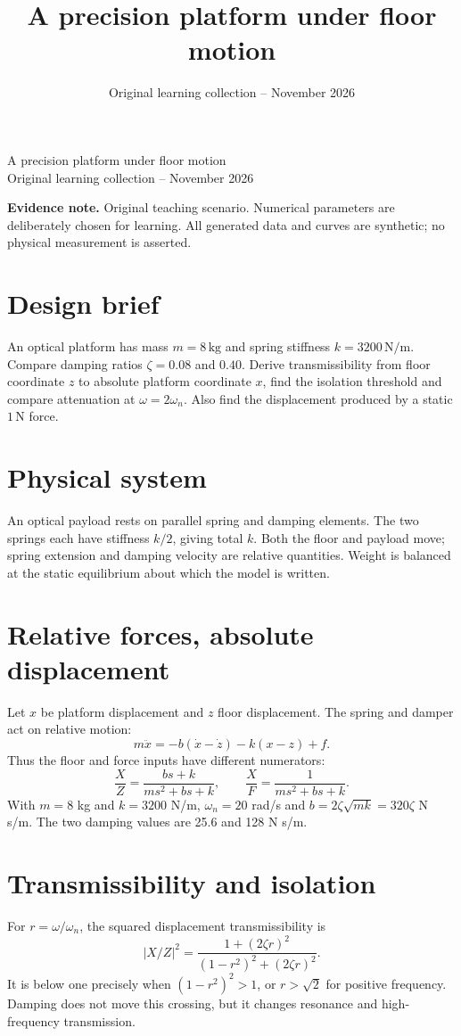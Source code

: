 \documentclass[10pt,a4paper]{article}
\title{\color{ink}A precision platform under floor motion}
\author{}
\date{Original learning collection -- November 2026}
\begin{document}
\begin{center}{\LARGE\color{ink}A precision platform under floor motion}\\[5pt]{\small Original learning collection -- November 2026}\end{center}

\textbf{Evidence note.} Original teaching scenario. Numerical parameters are deliberately chosen for learning. All generated data and curves are synthetic; no physical measurement is asserted.
\section{Design brief}
An optical platform has mass $m=8\,\mathrm{kg}$ and spring stiffness $k=3200\,\mathrm{N/m}$. Compare damping ratios $\zeta=0.08$ and $0.40$. Derive transmissibility from floor coordinate $z$ to absolute platform coordinate $x$, find the isolation threshold and compare attenuation at $\omega=2\omega_n$. Also find the displacement produced by a static $1\,\mathrm{N}$ force.
\section{Physical system}
\begin{center}\resizebox{.88\linewidth}{!}{}\par{\small An optical payload rests on parallel spring and damping elements. The two springs each have stiffness $k/2$, giving total $k$. Both the floor and payload move; spring extension and damping velocity are relative quantities. Weight is balanced at the static equilibrium about which the model is written.}\end{center}
\section{Relative forces, absolute displacement}
Let $x$ be platform displacement and $z$ floor displacement. The spring and damper act on relative motion:
\[m\ddot x=-b(\dot x-\dot z)-k(x-z)+f.\]
Thus the floor and force inputs have different numerators:
\[\frac{X}{Z}=\frac{bs+k}{ms^2+bs+k},\qquad \frac{X}{F}=\frac1{ms^2+bs+k}.\]
With $m=8$ kg and $k=3200$ N/m, $\omega_n=20$ rad/s and $b=2\zeta\sqrt{mk}=320\zeta$ N s/m. The two damping values are 25.6 and 128 N s/m.
\section{Transmissibility and isolation}
For $r=\omega/\omega_n$, the squared displacement transmissibility is
\[|X/Z|^2=\frac{1+(2\zeta r)^2}{(1-r^2)^2+(2\zeta r)^2}.\]
It is below one precisely when $(1-r^2)^2>1$, or $r>\sqrt2$ for positive frequency. Damping does not move this crossing, but it changes resonance and high-frequency transmission.
\end{document}
